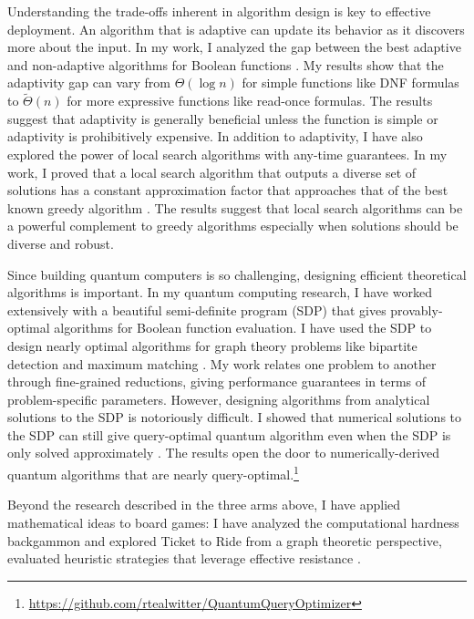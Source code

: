 \documentclass[11pt]{article}
\begin{document}
Understanding the trade-offs inherent in algorithm design is key to effective deployment. An algorithm that is adaptive can update its behavior as it discovers more about the input. In my work, I analyzed the gap between the best adaptive and non-adaptive algorithms for Boolean functions \cite{hellerstein2022adaptivity}. My results show that the adaptivity gap can vary from $\Theta(\log n)$ for simple functions like DNF formulas to $\tilde{\Theta}(n)$ for more expressive functions like read-once formulas. The results suggest that adaptivity is generally beneficial unless the function is simple or adaptivity is prohibitively expensive. In addition to adaptivity, I have also explored the power of local search algorithms with any-time guarantees. In my work, I proved that a local search algorithm that outputs a diverse set of solutions has a constant approximation factor that approaches that of the best known greedy algorithm \cite{hellerstein2022local}. The results suggest that local search algorithms can be a powerful complement to greedy algorithms especially when solutions should be diverse and robust.

Since building quantum computers is so challenging, designing efficient theoretical algorithms is important. In my quantum computing research, I have worked extensively with a beautiful semi-definite program (SDP) that gives provably-optimal algorithms for Boolean function evaluation. I have used the SDP to design nearly optimal algorithms for graph theory problems like bipartite detection and maximum matching \cite{delorenzo2019applications,kimmel2021query}. My work relates one problem to another through fine-grained reductions, giving performance guarantees in terms of problem-specific parameters. However, designing algorithms from analytical solutions to the SDP is notoriously difficult. I showed that numerical solutions to the SDP can still give query-optimal quantum algorithm even when the SDP is only solved approximately \cite{czekanski2023robust}. The results open the door to numerically-derived quantum algorithms that are nearly query-optimal.\footnote{\url{https://github.com/rtealwitter/QuantumQueryOptimizer}}

Beyond the research described in the three arms above, I have applied mathematical ideas to board games: I have analyzed the computational hardness backgammon \cite{witter2021backgammon} and explored Ticket to Ride from a graph theoretic perspective, evaluated heuristic strategies that leverage effective resistance \cite{witter2020applications}.
\end{document}
